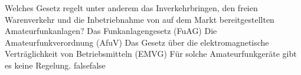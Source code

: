     {Welches Gesetz regelt unter anderem das Inverkehrbringen, den freien Warenverkehr und die Inbetriebnahme von auf dem Markt bereitgestellten Amateurfunkanlagen?}
    {Das Funkanlagengesetz (FuAG)}
    {Die Amateurfunkverordnung (AfuV)}
    {Das Gesetz über die elektromagnetische Verträglichkeit von Betriebsmitteln (EMVG)}
    {Für solche Amateurfunkgeräte gibt es keine Regelung.}
    {false}{false}